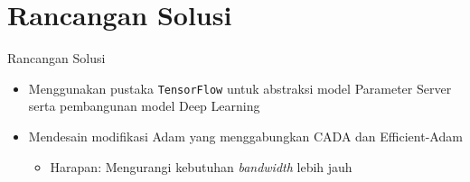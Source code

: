 \documentclass[aspectratio=169]{beamer}
\begin{document}
\section{Rancangan Solusi}
\begin{frame}{Rancangan Solusi}
  \begin{itemize}
    \item Menggunakan pustaka \texttt{TensorFlow} untuk abstraksi model Parameter Server serta pembangunan model Deep Learning
    \item Mendesain modifikasi Adam yang menggabungkan CADA dan Efficient-Adam
          \begin{itemize}
            \item Harapan: Mengurangi kebutuhan \textit{bandwidth} lebih jauh
          \end{itemize}
  \end{itemize}
\end{frame}
\end{document}
